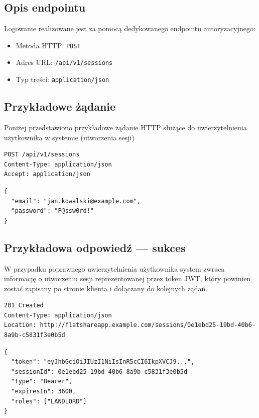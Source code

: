 \documentclass[11pt, a4paper]{article}
\begin{document}
\subsection{Opis endpointu}

Logowanie realizowane jest za pomocą dedykowanego endpointu autoryzacyjnego:

\begin{itemize}
    \item Metoda HTTP: \texttt{POST}
    \item Adres URL: \texttt{/api/v1/sessions}
    \item Typ treści: \texttt{application/json}
\end{itemize}

\subsection{Przykładowe żądanie}

Poniżej przedstawiono przykładowe żądanie HTTP służące do uwierzytelnienia
użytkownika w systemie (utworzenia sesji)

\begin{lstlisting}[style=http,caption={Przykładowe żądanie logowania}]
POST /api/v1/sessions
Content-Type: application/json
Accept: application/json
\end{lstlisting}

\begin{lstlisting}[style=json,caption={Ciało żądania logowania}]
{
  "email": "jan.kowalski@example.com",
  "password": "P@ssw0rd!"
}
\end{lstlisting}

\subsection{Przykładowa odpowiedź — sukces}

W przypadku poprawnego uwierzytelnienia użytkownika system zwraca informację o utworzeniu sesji reprezentowanej przez token JWT,
który powinien zostać zapisany po stronie klienta i dołączany do kolejnych żądań.

\begin{lstlisting}[style=http,caption={Odpowiedź HTTP — sukces}]
201 Created
Content-Type: application/json
Location: http://flatshareapp.example.com/sessions/0e1ebd25-19bd-40b6-8a9b-c5831f3e0b5d
\end{lstlisting}

\begin{lstlisting}[style=json,caption={Ciało odpowiedzi — sukces}]
{
  "token": "eyJhbGciOiJIUzI1NiIsInR5cCI6IkpXVCJ9...",
  "sessionId": 0e1ebd25-19bd-40b6-8a9b-c5831f3e0b5d
  "type": "Bearer",
  "expiresIn": 3600,
  "roles": ["LANDLORD"]
}
\end{lstlisting}
\end{document}
